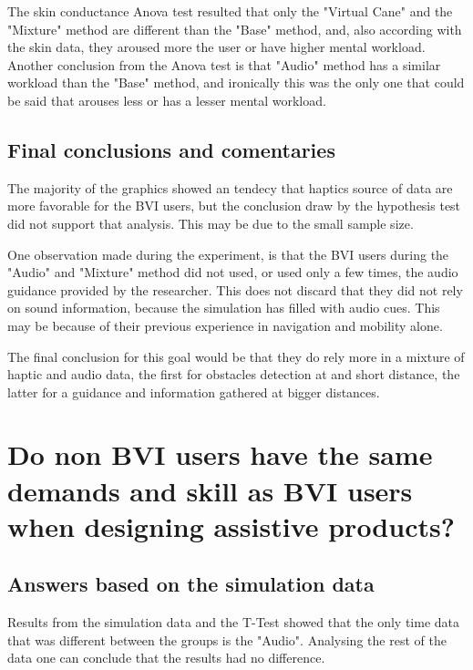 The skin conductance Anova test resulted that only the "Virtual Cane" and the "Mixture" method are different than the "Base" method, and, also according with the skin data, they aroused more the user or have higher mental workload. Another conclusion from the Anova test is that "Audio" method has a similar workload than the "Base" method, and ironically this was the only one that could be said that arouses less or has a lesser mental workload.

\subsection{Final conclusions and comentaries}

The majority of the graphics showed an tendecy that haptics source of data are more favorable for the BVI users, but the conclusion draw by the hypothesis test did not support that analysis. This may be due to the small sample size.

One observation made during the experiment, is that the BVI users during the "Audio" and "Mixture" method did not used, or used only a few times, the audio guidance provided by the researcher. This does not discard that they did not rely on sound information, because the simulation has filled with audio cues. This may be because of their previous experience in navigation and mobility alone.

The final conclusion for this goal would be that they do rely more in a mixture of haptic and audio data, the first for obstacles detection at and short distance, the latter for a guidance and information gathered at bigger distances.


\section{Do non BVI users have the same demands and skill as BVI users when designing assistive products?}

\subsection{Answers based on the simulation data}

Results from the simulation data and the T-Test showed that the only time data that was different between the groups is the "Audio". Analysing the rest of the data one can conclude that the results had no difference.

